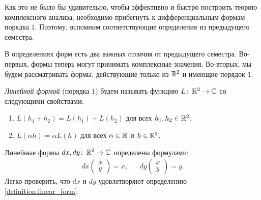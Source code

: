 Как это не было бы удивительно, чтобы эффективно и быстро построить теорию комплексного анализа, необходимо прибегнуть к дифференциальным формам порядка $1$. Поэтому, вспомним соответствующие определения из предыдущего семестра.

В определениях форм есть два важных отличия от предыдущего семестра. Во-первых, формы теперь могут принимать комплексные значения. Во-вторых, мы будем рассматривать формы, действующие только из $\mathbb{R}^{2}$ и имеющие порядок $1$. 

\begin{df}
 \label{definition:linear_form}
 \textit{Линейной формой} (порядка $1$) будем называть функцию $L \colon\, \mathbb{R}^{2} \to \mathbb{C}$ со следующими свойствами:
 \begin{enumerate}
  \item $L(h_1 + h_2) = L(h_1) + L(h_2)$ для всех $h_1, h_2 \in \mathbb{R}^{2}$.
  \item \label{enum2:definition:linear_form} $L(\alpha h) = \alpha L(h)$ для всех $\alpha \in \mathbb{R}$ и $h \in \mathbb{R}^{2}$.

 \end{enumerate}
\end{df}
\begin{exmpl}
 Линейные формы $dx, dy \colon\, \mathbb{R}^{2} \to \mathbb{C}$ определены формулами:
 \begin{align*}
  dx \begin{pmatrix}
   x \\ y
   \end{pmatrix} = x, & &dy \begin{pmatrix}
   x \\ y
  \end{pmatrix} = y.
 \end{align*} Легко проверить, что $dx$ и $dy$ удовлетворяют определению \ref{definition:linear_form}.
\end{exmpl}

